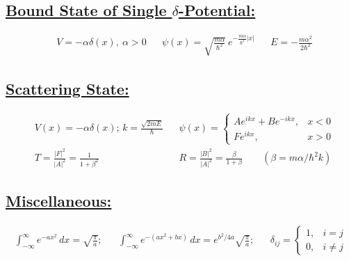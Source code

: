 \documentclass[a4paper,12pt]{article}
\begin{document}
\subsection*{\underline{Bound State of Single $\delta$-Potential:} }
\begin{align}
     & V=-\alpha\delta(x), \ \alpha>0
     & 
     & \psi(x)=\sqrt{\frac{m\alpha}{\hbar^2}}\ e^{-\frac{m\alpha}{\hbar^2}|x|}
     & 
     & E=-\frac{m\alpha^2}{2\hbar^2}
\end{align}

\subsection*{\underline{Scattering State:} }
\begin{align}
     & V(x)=-\alpha\delta(x);\, k = \frac{\sqrt{2mE}}{\hbar}
     & 
     & \psi(x) = \begin{cases}
        Ae^{ikx}+Be^{-ikx}, & x<0 \\
        Fe^{ikx},           & x>0
    \end{cases}
    \\
     & T=\frac{|F|^2}{|A|^2}=\frac{1}{1+\beta^2}
     & 
     & R=\frac{|B|^2}{|A|^2}=\frac{\beta}{1+\beta}\qquad (\beta=m\alpha/\hbar^2k)
\end{align}

\subsection*{\underline{Miscellaneous:}}
\begin{align}
    \int_{-\infty}^\infty e^{-ax^2}\, dx=\sqrt{\frac{\pi}{a}};
     &  & 
    \int_{-\infty}^\infty e^{-(ax^2+bx)}\,dx=e^{b^2/4a}\sqrt{\frac{\pi}{a}};
     &  & 
    \delta_{ij} =
    \begin{cases}
        1, & i=j     \\
        0, & i\neq j
    \end{cases}
\end{align}
\end{document}
